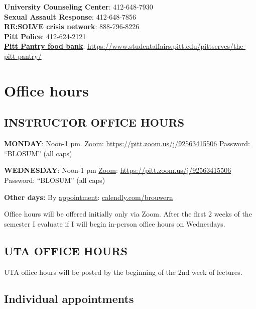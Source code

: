\documentclass[
]{book}
\begin{document}
\textbf{University Counseling Center}: 412-648-7930\\
\textbf{Sexual Assault Response}: 412-648-7856\\
\textbf{RE:SOLVE crisis network}: 888-796-8226\\
\textbf{Pitt Police}: 412-624-2121\\
\href{https://www.studentaffairs.pitt.edu/pittserves/the-pitt-pantry/}{\textbf{Pitt Pantry food bank}}: \url{https://www.studentaffairs.pitt.edu/pittserves/the-pitt-pantry/}

\hypertarget{office-hours}{%
\chapter{Office hours}\label{office-hours}}

\hypertarget{instructor-office-hours}{%
\section{INSTRUCTOR OFFICE HOURS}\label{instructor-office-hours}}

\textbf{MONDAY}: Noon-1 pm.
\href{https://pitt.zoom.us/j/92563415506}{Zoom}: \url{https://pitt.zoom.us/j/92563415506}
Password: ``BLOSUM'' (all caps)

\textbf{WEDNESDAY}: Noon-1 pm
\href{https://pitt.zoom.us/j/92563415506}{Zoom}: \url{https://pitt.zoom.us/j/92563415506}
Password: ``BLOSUM'' (all caps)

\textbf{Other days:} By \href{calendly.com/brouwern}{appointment}: \url{calendly.com/brouwern}

Office hours will be offered initially only via Zoom. After the first 2 weeks of the semester I evaluate if I will begin in-person office hours on Wednesdays.

\hypertarget{uta-office-hours}{%
\section{UTA OFFICE HOURS}\label{uta-office-hours}}

UTA office hours will be posted by the beginning of the 2nd week of lectures.\\

\hypertarget{individual-appointments}{%
\section{Individual appointments}\label{individual-appointments}}
\end{document}
